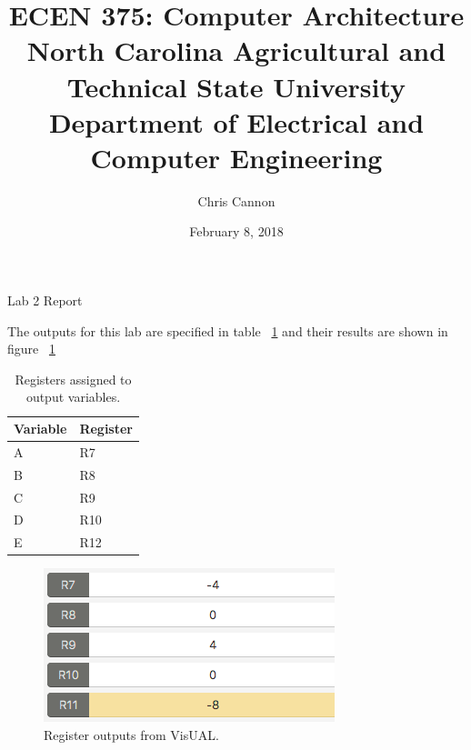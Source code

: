 \documentclass[11pt]{article}
\title {ECEN 375: Computer Architecture\\ North Carolina Agricultural and Technical State University \\ Department of Electrical and Computer Engineering} %
\author{Chris Cannon} %
\date{February 8, 2018}
\begin{document}
	
\maketitle

\begin{center}
	Lab 2 Report
\end{center}


The outputs for this lab are specified in table ~\ref{tab:lab3registers} and their results are shown in figure ~\ref{fig:lab3results}

\begin{table}[H]
\begin{center}
\begin{tabular}{| l | l |}
	\hline
	Variable & Register \\ \hline
	A & R7 \\ \hline
	B & R8 \\ \hline
	C & R9 \\ \hline
	D & R10 \\ \hline
	E & R12 \\ \hline
\end{tabular}
\caption{\label{tab:lab3registers} Registers assigned to output variables.}
\label{tab:lab3registers}
\end{center}
\end{table}

\begin{figure}[H]
\begin{center}
	\includegraphics{img3.png}
	\caption{\label{fig:lab3results} Register outputs from VisUAL.}
	\label{fig:lab3results}
\end{center}
\end{figure}
\end{document}
